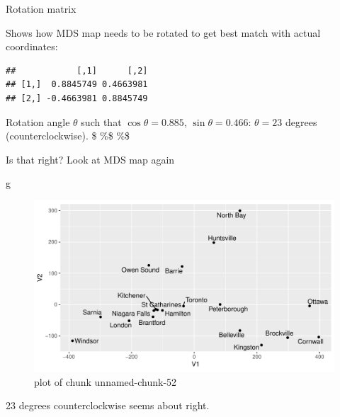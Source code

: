 \documentclass[ignorenonframetext,]{beamer}
\newenvironment{Shaded}{\begin{snugshade}}{\end{snugshade}}
\newcommand{\NormalTok}[1]{#1}
\newcommand{\OperatorTok}[1]{\textcolor[rgb]{0.81,0.36,0.00}{\textbf{#1}}}
\begin{document}
\begin{frame}[fragile]{Rotation matrix}
\protect\hypertarget{rotation-matrix}{}

Shows how MDS map needs to be rotated to get best match with actual
coordinates:

\begin{Shaded}
\end{Shaded}

\begin{verbatim}
##            [,1]      [,2]
## [1,]  0.8845749 0.4663981
## [2,] -0.4663981 0.8845749
\end{verbatim}

Rotation angle \(\theta\) such that \(\cos\theta=0.885\),
\(\sin\theta=0.466\): \(\theta=23\) degrees (counterclockwise). \$ \%\$
\%\$

\end{frame}

\begin{frame}[fragile]{Is that right? Look at MDS map again}
\protect\hypertarget{is-that-right-look-at-mds-map-again}{}

\begin{Shaded}
\begin{Highlighting}[]
\NormalTok{g}
\end{Highlighting}
\end{Shaded}

\begin{figure}
\centering
\includegraphics{figure/unnamed-chunk-52-1.pdf}
\caption{plot of chunk unnamed-chunk-52}
\end{figure}

23 degrees counterclockwise seems about right.

\end{frame}
\end{document}
